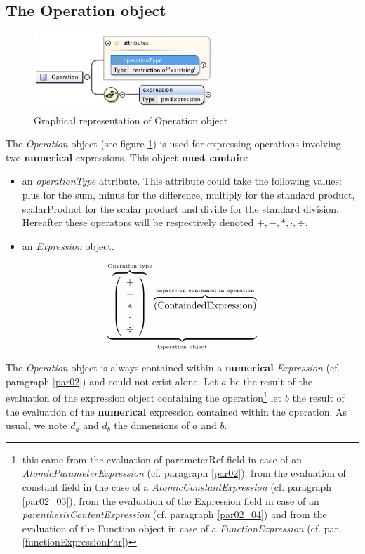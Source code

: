 \documentclass[a4paper,11pt] {ivoa}
\begin{document}
\subsection{The Operation object}\label{par02_02}
\begin{figure}[htbp]
\begin{center}
\includegraphics[width=0.6\textwidth]{pictures/Operation.jpg} 
\caption{Graphical representation of Operation object}
\label{Pic-Operation}
\end{center}
\end{figure}

The {\it Operation} object (see figure \ref{Pic-Operation}) is used for expressing operations
involving two {\bf numerical} expressions. This object {\bf must contain}:
\begin{itemize}
\item an {\it operationType} attribute. This attribute could take the following values: plus for the
sum, minus for the difference, multiply for the standard product, scalarProduct for the scalar
product and divide for the standard division. Hereafter these operators will be respectively denoted
$+,-,\ast,\cdot, \div$.
\item an {\it Expression} object.
\end{itemize}
\begin{equation}\label{OperationEquation}
\underbrace{ \overbrace{\left( \begin{array}{c} + \\ - \\ \ast  \\ \cdot \\ \div   \end{array} \right) }^{\mbox{\tiny Operation type}}
 \overbrace{    \left( \mbox{ContaindedExpression}\right) }^{\mbox{\tiny expression contained in operation}}   }_{\mbox{\tiny Operation object}}
\end{equation}

The {\it Operation} object is always contained within a {\bf numerical} {\it Expression} (cf.
paragraph \ref{par02}) and could not exist alone.
Let $a$ be the result of the evaluation of the expression object containing the
operation\footnote{this came from the evaluation of parameterRef field in case of an {\it
AtomicParameterExpression}  (cf. paragraph \ref{par02}), from the evaluation of constant field in the
case of a {\it AtomicConstantExpression} (cf. paragraph \ref{par02_03}), from the evaluation of the Expression field in case of an  {\it parenthesisContentExpression}  (cf. paragraph \ref{par02_04}) and from the evaluation of the Function object in case of a {\it FunctionExpression} (cf. par. \ref{functionExpressionPar}) }  let $b$ the
result of the evaluation of the {\bf numerical} expression contained within the operation. As usual,
we note $d_a$ and $d_b$ the dimensions of $a$ and $b$.\\
\end{document}
